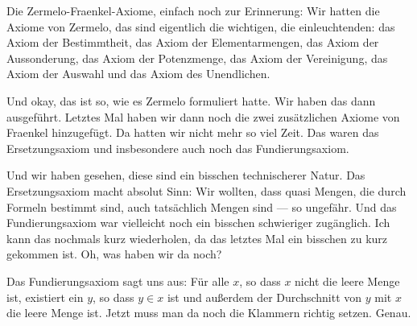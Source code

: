 \begin{spoken-clean}[00:03:45 - 00:05:48]
Die Zermelo-Fraenkel-Axiome, einfach noch zur Erinnerung: Wir hatten die Axiome von Zermelo, das sind eigentlich die wichtigen, die einleuchtenden: das Axiom der Bestimmtheit, das Axiom der Elementarmengen, das Axiom der Aussonderung, das Axiom der Potenzmenge, das Axiom der Vereinigung, das Axiom der Auswahl und das Axiom des Unendlichen.

Und okay, das ist so, wie es Zermelo formuliert hatte. Wir haben das dann ausgeführt. Letztes Mal haben wir dann noch die zwei zusätzlichen Axiome von Fraenkel hinzugefügt. Da hatten wir nicht mehr so viel Zeit. Das waren das Ersetzungsaxiom und insbesondere auch noch das Fundierungsaxiom.

Und wir haben gesehen, diese sind ein bisschen technischerer Natur. Das Ersetzungsaxiom macht absolut Sinn: Wir wollten, dass quasi Mengen, die durch Formeln bestimmt sind, auch tatsächlich Mengen sind --- so ungefähr. Und das Fundierungsaxiom war vielleicht noch ein bisschen schwieriger zugänglich. Ich kann das nochmals kurz wiederholen, da das letztes Mal ein bisschen zu kurz gekommen ist. Oh, was haben wir da noch?

Das Fundierungsaxiom sagt uns aus: Für alle $x$, so dass $x$ nicht die leere Menge ist, existiert ein $y$, so dass $y \in x$ ist und außerdem der Durchschnitt von $y$ mit $x$ die leere Menge ist. Jetzt muss man da noch die Klammern richtig setzen. Genau.
\end{spoken-clean}

\begin{ai-global-state-checkpoint-invisible-content}
\end{ai-global-state-checkpoint-invisible-content}

